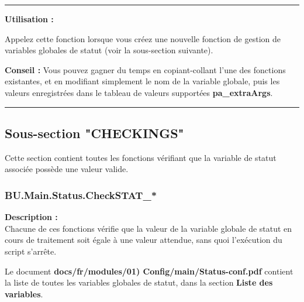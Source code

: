 \documentclass[a4paper,10pt]{article}
\begin{document}
\setlength{\parskip}{1em}


\par\noindent\rule{\textwidth}{0.4pt}

\begin{justify}
    \textbf{Utilisation :}

    Appelez cette fonction lorsque vous créez une nouvelle fonction de gestion de variables globales de statut (voir la sous-section suivante).
\end{justify}

\begin{justify}
    \textbf{Conseil :} Vous pouvez gagner du temps en copiant-collant l'une des fonctions existantes, et en modifiant simplement le nom de la variable globale, puis les valeurs enregistrées dans le tableau de valeurs supportées \textbf{\color{vars}pa\_extraArgs}.
\end{justify}



\color{sec2}\par\noindent\rule{\textwidth}{0.4pt}\color{text}

\color{sec2}
\subsection{Sous-section "CHECKINGS"}\color{text}

\begin{justify}
    Cette section contient toutes les fonctions vérifiant que la variable de statut associée possède une valeur valide.
\end{justify}

\color{sec3}
\subsubsection{BU.Main.Status.CheckSTAT\_*}\color{text}

\begin{justify}
    \textbf{Description :}\\[1\baselineskip]
    Chacune de ces fonctions vérifie que la valeur de la variable globale de statut en cours de traitement soit égale à une valeur attendue, sans quoi l'exécution du script s'arrête.
\end{justify}

\begin{justify}
     Le document \textbf{\color{lime}docs/fr/modules/01) Config/main/Status-conf.pdf} contient la liste de toutes les variables globales de statut, dans la section \textbf{\color{sec1}Liste des variables}.
\end{justify}\setlength{\parskip}{1em}
\end{document}
